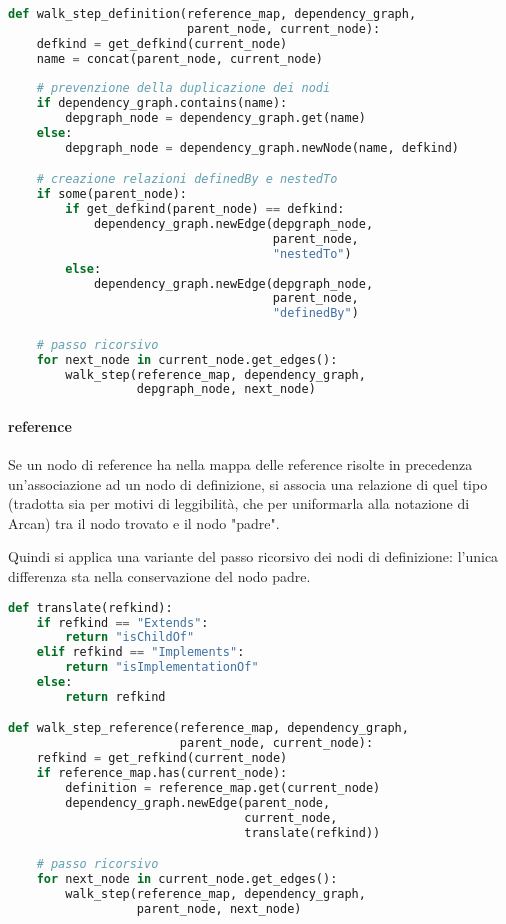 \begin{lstlisting}[language=Python, caption=pseudocodice]
def walk_step_definition(reference_map, dependency_graph,
                         parent_node, current_node):
    defkind = get_defkind(current_node)
    name = concat(parent_node, current_node)
    
    # prevenzione della duplicazione dei nodi
    if dependency_graph.contains(name):
        depgraph_node = dependency_graph.get(name)
    else:
        depgraph_node = dependency_graph.newNode(name, defkind)

    # creazione relazioni definedBy e nestedTo
    if some(parent_node):
        if get_defkind(parent_node) == defkind:
            dependency_graph.newEdge(depgraph_node,
                                     parent_node,
                                     "nestedTo")
        else:
            dependency_graph.newEdge(depgraph_node,
                                     parent_node,
                                     "definedBy")

    # passo ricorsivo
    for next_node in current_node.get_edges():
        walk_step(reference_map, dependency_graph,
                  depgraph_node, next_node)
\end{lstlisting}

\paragraph{reference}

Se un nodo di reference ha nella mappa delle reference risolte in precedenza un'associazione ad un nodo di definizione, si associa una relazione di quel tipo (tradotta sia per motivi di leggibilit\`a, che per uniformarla alla notazione di Arcan) tra il nodo trovato e il nodo "padre".

Quindi si applica una variante del passo ricorsivo dei nodi di definizione: l'unica differenza sta nella conservazione del nodo padre.

\begin{lstlisting}[language=Python, caption=pseudocodice]
def translate(refkind):
    if refkind == "Extends":
        return "isChildOf"
    elif refkind == "Implements":
        return "isImplementationOf"
    else:
        return refkind

def walk_step_reference(reference_map, dependency_graph,
                        parent_node, current_node):
    refkind = get_refkind(current_node)
    if reference_map.has(current_node):
        definition = reference_map.get(current_node)
        dependency_graph.newEdge(parent_node,
                                 current_node,
                                 translate(refkind))

    # passo ricorsivo
    for next_node in current_node.get_edges():
        walk_step(reference_map, dependency_graph,
                  parent_node, next_node)
\end{lstlisting}

